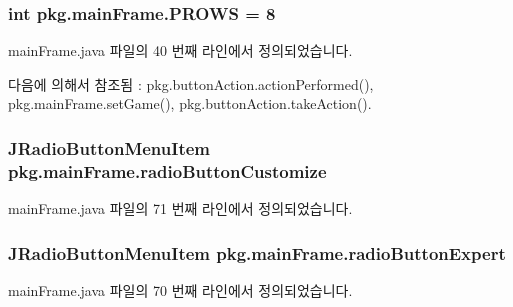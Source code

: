 \subsubsection[{\texorpdfstring{P\+R\+O\+WS}{PROWS}}]{\setlength{\rightskip}{0pt plus 5cm}int pkg.\+main\+Frame.\+P\+R\+O\+WS = 8\hspace{0.3cm}{\ttfamily [static]}}\hypertarget{classpkg_1_1main_frame_a6d9a76db81895214a2acaab598dc2a7c}{}\label{classpkg_1_1main_frame_a6d9a76db81895214a2acaab598dc2a7c}


main\+Frame.\+java 파일의 40 번째 라인에서 정의되었습니다.



다음에 의해서 참조됨 \+:  pkg.\+button\+Action.\+action\+Performed(), pkg.\+main\+Frame.\+set\+Game(), pkg.\+button\+Action.\+take\+Action().

\subsubsection[{\texorpdfstring{radio\+Button\+Customize}{radioButtonCustomize}}]{\setlength{\rightskip}{0pt plus 5cm}J\+Radio\+Button\+Menu\+Item pkg.\+main\+Frame.\+radio\+Button\+Customize\hspace{0.3cm}{\ttfamily [private]}}\hypertarget{classpkg_1_1main_frame_a0391d895fba86ae5b87b88eb2b8b876e}{}\label{classpkg_1_1main_frame_a0391d895fba86ae5b87b88eb2b8b876e}


main\+Frame.\+java 파일의 71 번째 라인에서 정의되었습니다.

\subsubsection[{\texorpdfstring{radio\+Button\+Expert}{radioButtonExpert}}]{\setlength{\rightskip}{0pt plus 5cm}J\+Radio\+Button\+Menu\+Item pkg.\+main\+Frame.\+radio\+Button\+Expert\hspace{0.3cm}{\ttfamily [private]}}\hypertarget{classpkg_1_1main_frame_a3c5879fc83a0488e3cf3d42dda313c13}{}\label{classpkg_1_1main_frame_a3c5879fc83a0488e3cf3d42dda313c13}


main\+Frame.\+java 파일의 70 번째 라인에서 정의되었습니다.

